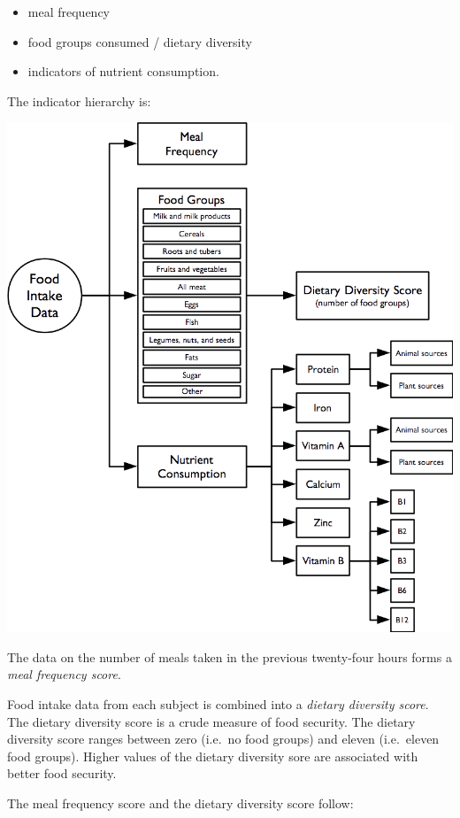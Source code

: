 \documentclass[12pt,a4paper]{book}
\providecommand{\tightlist}{%
  \setlength{\itemsep}{0pt}\setlength{\parskip}{0pt}}
\theoremstyle{definition}
\theoremstyle{definition}
\theoremstyle{definition}
\theoremstyle{remark}
\begin{document}
\begin{itemize}
\tightlist
\item
  meal frequency
\item
  food groups consumed / dietary diversity
\item
  indicators of nutrient consumption.
\end{itemize}

The indicator hierarchy is:

\begin{center}\includegraphics[width=800pt]{figures/indicators04} \end{center}

The data on the number of meals taken in the previous twenty-four hours
forms a \emph{meal frequency score}.

Food intake data from each subject is combined into a \emph{dietary
diversity score}. The dietary diversity score is a crude measure of food
security. The dietary diversity score ranges between zero (i.e.~no food
groups) and eleven (i.e.~eleven food groups). Higher values of the
dietary diversity sore are associated with better food security.

The meal frequency score and the dietary diversity score follow:
\end{document}
